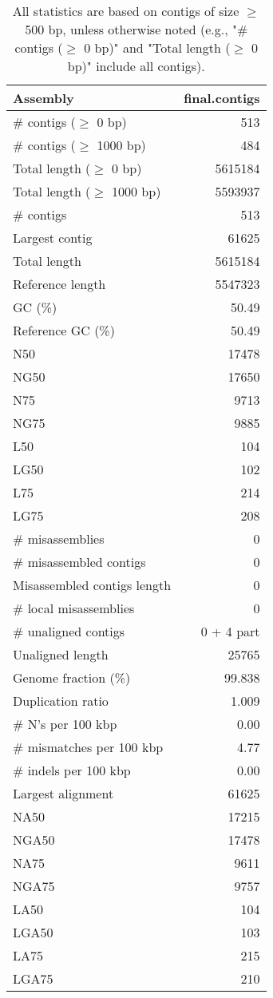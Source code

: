 \documentclass[12pt,a4paper]{article}
\begin{document}
\begin{table}[ht]
\begin{center}
\caption{All statistics are based on contigs of size $\geq$ 500 bp, unless otherwise noted (e.g., "\# contigs ($\geq$ 0 bp)" and "Total length ($\geq$ 0 bp)" include all contigs).}
\begin{tabular}{|l*{1}{|r}|}
\hline
Assembly & final.contigs \\ \hline
\# contigs ($\geq$ 0 bp) & 513 \\ \hline
\# contigs ($\geq$ 1000 bp) & 484 \\ \hline
Total length ($\geq$ 0 bp) & 5615184 \\ \hline
Total length ($\geq$ 1000 bp) & 5593937 \\ \hline
\# contigs & 513 \\ \hline
Largest contig & 61625 \\ \hline
Total length & 5615184 \\ \hline
Reference length & 5547323 \\ \hline
GC (\%) & 50.49 \\ \hline
Reference GC (\%) & 50.49 \\ \hline
N50 & 17478 \\ \hline
NG50 & 17650 \\ \hline
N75 & 9713 \\ \hline
NG75 & 9885 \\ \hline
L50 & 104 \\ \hline
LG50 & 102 \\ \hline
L75 & 214 \\ \hline
LG75 & 208 \\ \hline
\# misassemblies & 0 \\ \hline
\# misassembled contigs & 0 \\ \hline
Misassembled contigs length & 0 \\ \hline
\# local misassemblies & 0 \\ \hline
\# unaligned contigs & 0 + 4 part \\ \hline
Unaligned length & 25765 \\ \hline
Genome fraction (\%) & 99.838 \\ \hline
Duplication ratio & 1.009 \\ \hline
\# N's per 100 kbp & 0.00 \\ \hline
\# mismatches per 100 kbp & 4.77 \\ \hline
\# indels per 100 kbp & 0.00 \\ \hline
Largest alignment & 61625 \\ \hline
NA50 & 17215 \\ \hline
NGA50 & 17478 \\ \hline
NA75 & 9611 \\ \hline
NGA75 & 9757 \\ \hline
LA50 & 104 \\ \hline
LGA50 & 103 \\ \hline
LA75 & 215 \\ \hline
LGA75 & 210 \\ \hline
\end{tabular}
\end{center}
\end{table}
\end{document}

